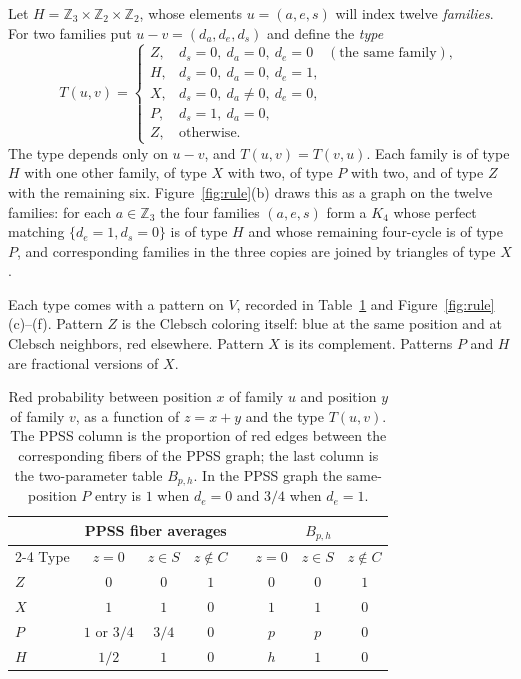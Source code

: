 \documentclass[11pt]{article}
\theoremstyle{definition}
\theoremstyle{remark}
\newcommand{\Z}{\mathbb Z}
\begin{document}
Let $H=\Z_3\times\Z_2\times\Z_2$, whose elements $u=(a,e,s)$ will index twelve \emph{families}.
For two families put $u-v=(d_a,d_e,d_s)$ and define the \emph{type}
\begin{equation}
\label{eq:types}
 T(u,v)=
 \begin{cases}
 Z, & d_s=0,\ d_a=0,\ d_e=0 \quad(\text{the same family}),\\
 H, & d_s=0,\ d_a=0,\ d_e=1,\\
 X, & d_s=0,\ d_a\ne0,\ d_e=0,\\
 P, & d_s=1,\ d_a=0,\\
 Z, & \text{otherwise}.
 \end{cases}
\end{equation}
The type depends only on $u-v$, and $T(u,v)=T(v,u)$.
Each family is of type $H$ with one other family, of type $X$ with two, of type $P$ with two, and of type $Z$ with the remaining six.
Figure~\ref{fig:rule}(b) draws this as a graph on the twelve families: for each $a\in\Z_3$ the four families $(a,e,s)$ form a $K_4$ whose perfect matching $\{d_e=1,d_s=0\}$ is of type $H$ and whose remaining four-cycle is of type $P$, and corresponding families in the three copies are joined by triangles of type $X$.

Each type comes with a pattern on $V$, recorded in Table~\ref{tab:types} and Figure~\ref{fig:rule}(c)--(f).
Pattern $Z$ is the Clebsch coloring itself: blue at the same position and at Clebsch neighbors, red elsewhere.
Pattern $X$ is its complement.
Patterns $P$ and $H$ are fractional versions of $X$.

\begin{table}[tbp]
\centering
\caption{Red probability between position $x$ of family $u$ and position $y$ of family $v$, as a function of $z=x+y$ and the type $T(u,v)$.
The PPSS column is the proportion of red edges between the corresponding fibers of the PPSS graph; the last column is the two-parameter table $B_{p,h}$.
In the PPSS graph the same-position $P$ entry is $1$ when $d_e=0$ and $3/4$ when $d_e=1$.}
\label{tab:types}
\begin{tabular}{@{}l ccc c ccc@{}}
\toprule
 & \multicolumn{3}{c}{PPSS fiber averages} && \multicolumn{3}{c}{$B_{p,h}$}\\
\cmidrule{2-4}\cmidrule{6-8}
Type & $z=0$ & $z\in S$ & $z\notin C$ && $z=0$ & $z\in S$ & $z\notin C$\\
\midrule
$Z$ & $0$ & $0$ & $1$ && $0$ & $0$ & $1$\\
$X$ & $1$ & $1$ & $0$ && $1$ & $1$ & $0$\\
$P$ & $1$ or $3/4$ & $3/4$ & $0$ && $p$ & $p$ & $0$\\
$H$ & $1/2$ & $1$ & $0$ && $h$ & $1$ & $0$\\
\bottomrule
\end{tabular}
\end{table}
\end{document}

